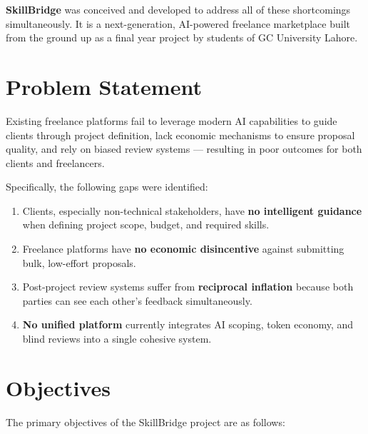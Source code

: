 \textbf{SkillBridge} was conceived and developed to address all of these shortcomings
simultaneously. It is a next-generation, AI-powered freelance marketplace built from the
ground up as a final year project by students of GC University Lahore.

\section{Problem Statement}
\label{sec:problem}

\begin{infobox}
Existing freelance platforms fail to leverage modern AI capabilities to guide clients
through project definition, lack economic mechanisms to ensure proposal quality, and
rely on biased review systems — resulting in poor outcomes for both clients and
freelancers.
\end{infobox}

\vspace{0.5em}
Specifically, the following gaps were identified:

\begin{enumerate}
  \item Clients, especially non-technical stakeholders, have \textbf{no intelligent guidance}
        when defining project scope, budget, and required skills.
  \item Freelance platforms have \textbf{no economic disincentive} against submitting bulk,
        low-effort proposals.
  \item Post-project review systems suffer from \textbf{reciprocal inflation} because both
        parties can see each other's feedback simultaneously.
  \item \textbf{No unified platform} currently integrates AI scoping, token economy, and
        blind reviews into a single cohesive system.
\end{enumerate}

\section{Objectives}
\label{sec:objectives}

The primary objectives of the SkillBridge project are as follows:

